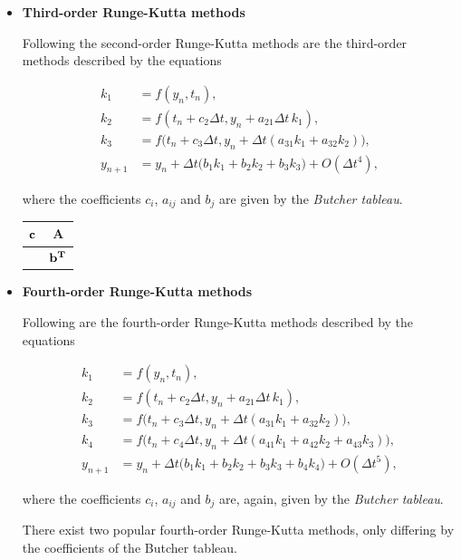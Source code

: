 \begin{itemize}
\hspace{20pt}
\item \textbf{Third-order Runge-Kutta methods}

Following the second-order Runge-Kutta methods 
are the third-order methods described by the equations

\begin{align}
   k_1 & =  f(y_n,t_n), \label{eqn:rk1_step } \\
   k_2 & =  f\left(t_n + c_2\Delta t,y_n + a_{21}\Delta t\,k_1\right), \\
   k_3 & =  f\big(t_n + c_3\Delta t, 
        y_n + \Delta t\left( a_{31}k_1 +a_{32}k_2\right)\big), 
      \label{eqn:rk3_step }\\
   y_{n+1} & = y_n + \Delta t\Big( b_1k_1 
              +  b_2 k_2 + b_3 k_3\Big) + O(\Delta t^4) \label{eqn:rk3},
\end{align}

\noindent where the coefficients $c_i$, $a_{ij}$ and $b_j$
are given by the \emph{Butcher tableau}. 

\begin{table}%
\begin{tabular}{l|c}
$\boldsymbol{\rm c}$      &   $\boldsymbol{A}$                   \\
\hline
\rule{0pt}{3ex}           &  $\boldsymbol{\rm b^T}$  
\end{tabular}
\end{table}


\hspace{20pt}
\item \textbf{Fourth-order Runge-Kutta methods}

Following are the fourth-order Runge-Kutta methods described by the equations

\begin{align}
   k_1 & =  f(y_n,t_n), \label{eqn:rk1_step } \\
   k_2 & =  f\left(t_n + c_2\Delta t,y_n + a_{21}\Delta t\,k_1\right), \\
   k_3 & =  f\big(t_n + c_3\Delta t, 
        y_n + \Delta t\left( a_{31}k_1 +a_{32}k_2\right)\big), \\
   k_4 & =  f\big(t_n + c_4\Delta t, 
        y_n + \Delta t\left( a_{41}k_1 +a_{42}k_2 + a_{43}k_3\right)\big), 
      \label{eqn:rk4_step }\\
   y_{n+1} & = y_n + \Delta t\Big( b_1k_1 
              +  b_2 k_2 + b_3 k_3 + b_4 k_4\Big) 
+ O(\Delta t^5) \label{eqn:rk4},
\end{align}

\noindent where the coefficients $c_i$, $a_{ij}$ and $b_j$
are, again, given by the \emph{Butcher tableau}. 

There exist two popular fourth-order Runge-Kutta methods,
only differing by the coefficients of the Butcher tableau. 
\end{itemize}

